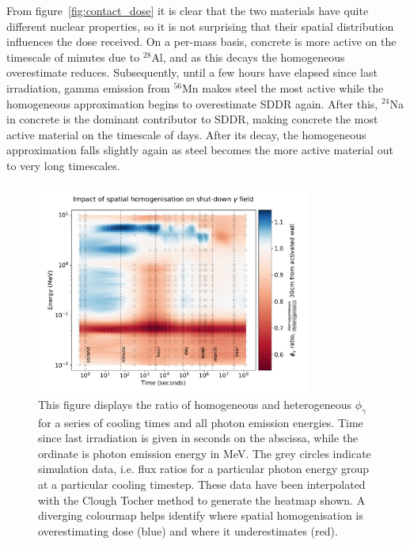 From figure~\ref{fig:contact_dose} it is clear that the two materials have quite different nuclear properties, so it is not surprising that their spatial distribution influences the dose received. On a per-mass basis, concrete is more active on the timescale of minutes due to $^{28}$Al, and as this decays the homogeneous overestimate reduces. Subsequently, until a few hours have elapsed since last irradiation, gamma emission from $^{56}$Mn makes steel the most active while the homogeneous approximation begins to overestimate SDDR again. After this, $^{24}$Na in concrete is the dominant contributor to SDDR, making concrete the most active material on the timescale of days. After its decay, the homogeneous approximation falls slightly again as steel becomes the more active material out to very long timescales. 

\begin{figure}[H]
  \centering
  \includegraphics[width=0.8\textwidth]{sddr_nrg.pdf}
  \caption{This figure displays the ratio of homogeneous and heterogeneous $\phi_{\gamma}$ for a series of cooling times and all photon emission energies. Time since last irradiation is given in seconds on the abscissa, while the ordinate is photon emission energy in MeV. The grey circles indicate simulation data, i.e. flux ratios for a particular photon energy group at a particular cooling timestep. These data have been interpolated with the Clough Tocher method to generate the heatmap shown. A diverging colourmap helps identify where spatial homogenisation is overestimating dose (blue) and where it underestimates (red).}
  \label{fig:sddr_nrg}
\end{figure}

